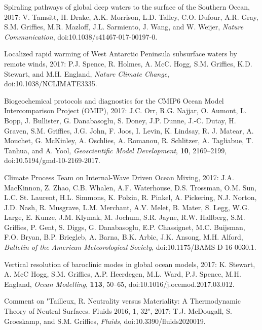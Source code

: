 \begin{etaremune}
\item Spiraling pathways of global deep waters to the surface of the Southern Ocean, 2017: V. Tamsitt, H.  Drake, A.K. Morrison, L.D. Talley, C.O. Dufour, A.R. Gray, S.M. Grif\/f\/ies, M.R. Mazloff, J.L. Sarmiento, J. Wang, and W. Weijer, {\it Nature Communication}, doi:10.1038/s41467-017-00197-0.

\item Localized rapid warming of West Antarctic Peninsula subsurface waters by remote winds, 2017: P.J. Spence, R. Holmes, A. McC. Hogg,   S.M. Grif\/f\/ies, K.D. Stewart, and M.H. England, {\it Nature Climate Change}, doi:10.1038/NCLIMATE3335.

\item Biogeochemical protocols and diagnostics for the CMIP6 Ocean Model Intercomparison Project (OMIP), 2017: J.C. Orr, R.G. Najjar, O. Aumont, L.  Bopp, J. Bullister, G. Danabasoglu, S. Doney,  J.P. Dunne, J.-C. Dutay, H. Graven, S.M. Grif\/f\/ies, J.G. John, F. Joos, I. Levin, K. Lindsay, R. J. Matear, A. Mouchet, G. McKinley, A. Oschlies, A. Romanou, R. Schlitzer, A. Tagliabue, T. Tanhua, and A. Yool, {\it Geoscientific Model Development}, {\bf 10}, 2169--2199, doi:10.5194/gmd-10-2169-2017.

\item Climate Process Team on Internal-Wave Driven Ocean Mixing, 2017:  J.A. MacKinnon, Z. Zhao, C.B. Whalen, A.F. Waterhouse, D.S. Trossman, O.M. Sun, L.C. St. Laurent, H.L. Simmons, K. Polzin, R. Pinkel, A. Pickering, N.J. Norton, J.D. Nash, R. Musgrave, L.M. Merchant, A.V. Melet, B. Mater, S. Legg, W.G. Large, E. Kunze, J.M. Klymak,  M. Jochum, S.R. Jayne, R.W. Hallberg, S.M. Grif\/f\/ies, P. Gent, S. Diggs, G. Danabasoglu, E.P. Chassignet, M.C. Buijsman, F.O. Bryan, B.P. Briegleb, A. Barna, B.K. Arbic,  J.K. Ansong, M.H. Alford, {\it Bulletin of the American Meteorological Society}, doi:10.1175/BAMS-D-16-0030.1.

\item Vertical resolution of baroclinic modes in global ocean models,  2017: K. Stewart, A. McC Hogg, S.M. Grif\/f\/ies, A.P. Heerdegen, M.L. Ward, P.J. Spence, M.H. England,  {\it Ocean Modelling}, {\bf 113}, 50--65, doi:10.1016/j.ocemod.2017.03.012.

\item Comment on "Tailleux, R. Neutrality versus Materiality: A Thermodynamic Theory of Neutral Surfaces. Fluids 2016, 1, 32", 2017: T.J. McDougall, S. Groeskamp, and S.M. Grif\/f\/ies, 
{\it Fluids}, doi:10.3390/fluids2020019. 


\end{etaremune}
